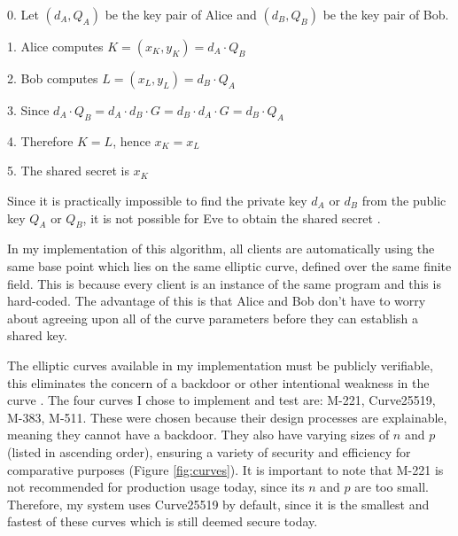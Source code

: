 \documentclass[12pt,a4paper]{article}
\begin{document}
\vspace{1mm}

0. \space Let $(d_A,Q_A)$ be the key pair of Alice and $(d_B,Q_B)$ be the key pair of Bob.

1. \space Alice computes $K = (x_K,y_K) = d_A \cdot Q_B$

2. \space Bob computes $L = (x_L,y_L) = d_B \cdot Q_A$

3. \space Since $d_A \cdot Q_B = d_A \cdot d_B \cdot G = d_B \cdot d_A \cdot G = d_B \cdot Q_A$

4. \space Therefore $K = L$, \space hence $x_K = x_L$

5. \space The shared secret is $x_K$

\vspace{1mm}

Since it is practically impossible to find the private key $d_A$ or $d_B$ from the public key $Q_A$ or $Q_B$, 
it is not possible for Eve to obtain the shared secret \cite{jurivsic1997elliptic,anoop2007elliptic,brown2009standards,silverman2009arithmetic}. 

\vspace{5mm}

In my implementation of this algorithm, all clients are automatically using the same base point which lies 
on the same elliptic curve, defined over the same finite field. 
This is because every client is an instance of the same program and this is hard-coded. 
The advantage of this is that Alice and Bob don't have to worry about agreeing upon all of the 
curve parameters before they can establish a shared key. 

The elliptic curves available in my implementation must be publicly verifiable, this eliminates the concern of a backdoor or other intentional weakness in the curve \cite{bernstein2013safecurves}. 
The four curves I chose to implement and test are: M-221, Curve25519, M-383, M-511. 
These were chosen because their design processes are explainable, meaning they cannot have a backdoor. 
They also have varying sizes of $n$ and $p$ (listed in ascending order), ensuring a variety of security and efficiency for comparative purposes (Figure \ref{fig:curves}). 
It is important to note that M-221 is not recommended for production usage today, since its $n$ and $p$ are too small. 
Therefore, my system uses Curve25519 by default, since it is the smallest and fastest of these curves which is still deemed secure today. 
\end{document}
